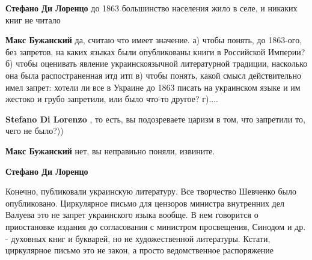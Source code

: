 \begin{itemize}
\begin{itemize}
\textbf{Стефано Ди Лоренцо} до 1863 большинство населения жило в селе, и никаких книг не читало

 
\textbf{Макс Бужанский} да, считаю что имеет значение. а) чтобы понять, до
1863-ого, без запретов, на каких языках были опубликованы книги в Российской
Империи? б) чтобы оценивать явление украинскоязычной литературной традиции,
насколько она была распостраненная итд итп в) чтобы понять, какой смысл
действительно имел запрет: хотели ли все в Украине до 1863 писать на украинском
языке и им жестоко и грубо запретили, или было что-то другое? г)....

 
\textbf{Stefano Di Lorenzo} , то есть, вы подозреваете царизм в том, что запретили то, чего не было?))

 
\textbf{Макс Бужанский} нет, вы неправиьно поняли, извините.

 
\textbf{Стефано Ди Лоренцо} 

Конечно, публиковали украинскую литературу. Все творчество Шевченко было
опубликовано. Циркулярное письмо для цензоров министра внутренних дел Валуева
это не запрет украинского языка вообще. В нем говорится о приостановке издания
до согласования с министром просвещения, Синодом и др. - духовных книг и
букварей, но не художественной литературы. Кстати, циркулярное письмо это не
закон, а просто ведомственное распоряжение


\end{itemize}
\end{itemize}
